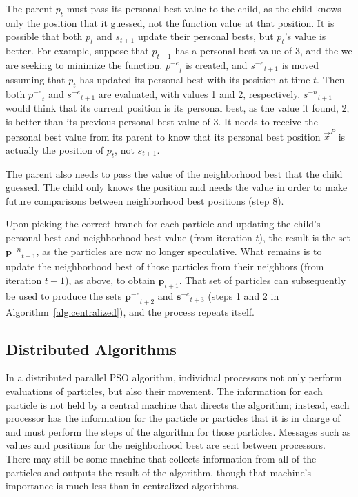 \documentclass[journal,letterpaper]{IEEEtran}
\newcommand{\alg}[1]{Algorithm~\ref{alg:#1}}
\providecommand{\pers}{\ensuremath{P}}
\providecommand{\pbest}{\ensuremath{\Vec{x}^\pers}}
\providecommand{\noeval}[1]{\ensuremath{#1^{-e}}}
\providecommand{\nonbest}[1]{\ensuremath{#1^{-n}}}
\providecommand{\p}{\ensuremath{p}}
\providecommand{\pset}{\ensuremath{\mathbf{p}}}
\providecommand{\s}{\ensuremath{s}}
\providecommand{\sset}{\ensuremath{\mathbf{s}}}
\begin{document}
The parent $\p_t$ must pass its personal best value to the child, as the child
knows only the position that it guessed, not the function value at that
position.  It is possible that both $\p_t$ and $\s_{t+1}$ update their personal
bests, but $\p_t$'s value is better.  For example, suppose that $\p_{t-1}$ has
a personal best value of 3, and the we are seeking to minimize the function.
$\noeval{\p}_t$ is created, and $\noeval{\s}_{t+1}$ is moved assuming that
$\p_t$ has updated its personal best with its position at time $t$.  Then both
$\noeval{\p}_t$ and $\noeval{\s}_{t+1}$ are evaluated, with values 1 and 2,
respectively.  $\nonbest{\s}_{t+1}$ would think that its current position is
its personal best, as the value it found, 2, is better than its previous
personal best value of 3.  It needs to receive the personal best value from its
parent to know that its personal best position $\pbest$ is actually the
position of $\p_t$, not $\s_{t+1}$.

The parent also needs to pass the value of the neighborhood best that the child
guessed.  The child only knows the position and needs the value in order to
make future comparisons between neighborhood best positions (step 8).

Upon picking the correct branch for each particle and updating the child's
personal best and neighborhood best value (from iteration $t$), the result is
the set $\nonbest{\pset}_{t+1}$, as the particles are now no longer
speculative.  What remains is to update the neighborhood best of those
particles from their neighbors (from iteration $t+1$), as above, to obtain
$\pset_{t+1}$.  That set of particles can subsequently be used to produce the
sets $\noeval{\pset}_{t+2}$ and $\noeval{\sset}_{t+3}$ (steps 1 and 2 in
\alg{centralized}), and the process repeats itself.

\subsection{Distributed Algorithms}

\label{sec:distributed}

In a distributed parallel PSO algorithm, individual processors not only perform
evaluations of particles, but also their movement.  The information for each
particle is not held by a central machine that directs the algorithm; instead,
each processor has the information for the particle or particles that it is in
charge of and must perform the steps of the algorithm for those particles.
Messages such as values and positions for the neighborhood best are sent
between processors.  There may still be some machine that collects information
from all of the particles and outputs the result of the algorithm, though that
machine's importance is much less than in centralized algorithms.
\end{document}
